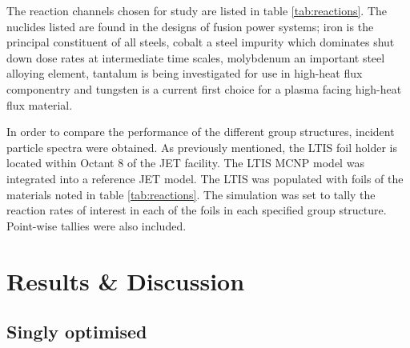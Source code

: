 The reaction channels chosen for study are listed in table \ref{tab:reactions}. The nuclides listed are found in the designs of fusion power systems; iron is the principal constituent of all steels, cobalt a steel impurity which dominates shut down dose rates at intermediate time scales, molybdenum an important steel alloying element, tantalum is being investigated for use in high-heat flux componentry and tungsten is a current first choice for a plasma facing high-heat flux material.

In order to compare the performance of the different group structures, incident particle spectra were obtained. As previously mentioned, the LTIS foil holder is located within Octant 8 of the JET facility. The LTIS MCNP model \cite{lengar2017} was integrated into a reference JET model. The LTIS was populated with foils of the materials noted in table \ref{tab:reactions}. The simulation was set to tally the reaction rates of interest in each of the foils in each specified group structure. Point-wise tallies were also included.

\section{Results \& Discussion}
\label{sec:results}


\subsection{Singly optimised}

